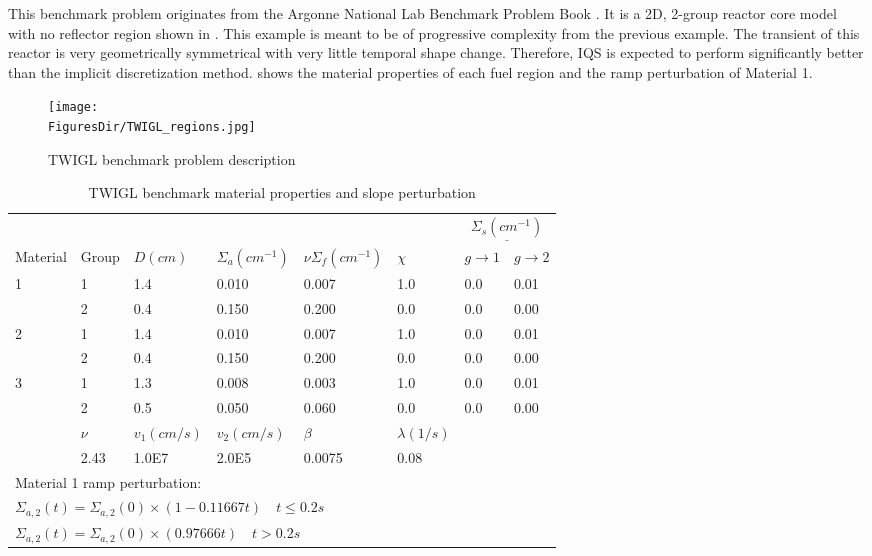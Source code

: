 This benchmark problem originates from the Argonne National Lab Benchmark Problem Book \cite{ANL_BPB}.  It is a 2D, 2-group reactor core model with no reflector region shown in  \cite{TWIGL_benchmark}.  This example is meant to be of progressive complexity from the previous example.  The transient of this reactor is very geometrically symmetrical with very little temporal shape change.  Therefore, IQS is expected to perform significantly better than the implicit discretization method.   shows the material properties of each fuel region and the ramp perturbation of Material 1.

\begin{figure}[!htbp]
\begin{center}
\texttt{[image: \\FiguresDir/TWIGL\_regions.jpg]}
\caption{TWIGL benchmark problem description}
\label{fig:TWIGL_reg}
\end{center}
\end{figure}
\begin{table}[!htbp]
\begin{center}
\caption{TWIGL benchmark material properties and slope perturbation}
\label{tab:TWIGL_mat}
\begin{tabular}{llllllll}
\hline
  &  &  &  &  &  &  \multicolumn{2}{c}{$\underline{\Sigma_s (cm^{-1})} $} \\
Material & Group & $D (cm)$ & $\Sigma_a (cm^{-1})$ & $\nu\Sigma_f (cm^{-1})$ & $\chi$ & $g \rightarrow 1$ & $g \rightarrow 2$ \\
\hline
1 & 1 & 1.4 & 0.010 & 0.007 & 1.0 & 0.0 & 0.01 \\
  & 2 & 0.4 & 0.150 & 0.200 & 0.0 & 0.0 & 0.00  \\
2 & 1 & 1.4 & 0.010 & 0.007 & 1.0 & 0.0 & 0.01  \\
  & 2 & 0.4 & 0.150 & 0.200 & 0.0 & 0.0 & 0.00  \\
3 & 1 & 1.3 & 0.008 & 0.003 & 1.0 & 0.0 & 0.01  \\
  & 2 & 0.5 & 0.050 & 0.060 & 0.0 & 0.0 & 0.00  \\
\hline
  & $\nu$ & $v_1 (cm/s)$ & $v_2 (cm/s)$ & $\beta$ & $\lambda (1/s)$ &   &   \\
\hline
  & 2.43 & 1.0E7 & 2.0E5 & 0.0075 & 0.08 &   &   \\
\hline
 \multicolumn{8}{l}{\footnotesize Material 1 ramp perturbation:} \\
\multicolumn{8}{l}{\footnotesize $\Sigma_{a,2}(t)=\Sigma_{a,2}(0) \times (1-0.11667t) \quad t \leq 0.2 s$} \\
\multicolumn{8}{l}{\footnotesize $\Sigma_{a,2}(t)=\Sigma_{a,2}(0) \times (0.97666t) \quad t > 0.2 s$} \normalsize
\end{tabular}
\end{center}
\end{table}

